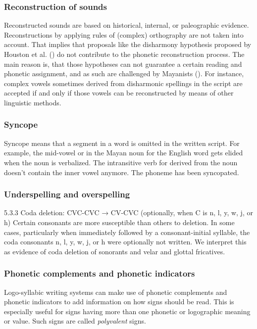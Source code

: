 \documentclass[../main.tex]{subfiles}
\begin{document}
\subsubsection{Reconstruction of sounds}
Reconstructed sounds are based on historical, internal, or paleographic evidence.
Reconstructions by applying rules of (complex) orthography are not taken into account.
That implies that proposals like the disharmony hypothesis proposed by 
Houston et al. (\cites{lacadena2004}{houstonstuartrobertson1998}) do not contribute to the
phonetic reconstruction process.
The main reason is, that those hypotheses can not guarantee a certain reading and phonetic
assignment, and as such are challenged by Mayanists (\cite[7]{boot2009}).
For instance, complex vowels sometimes derived from disharmonic spellings in the script are
accepted if and only if those vowels can be reconstructed by means of other linguistic methods.

\subsubsection{Syncope}
Syncope means that a segment in a word is omitted in the written script.
For example, the mid-vowel  or  in the Mayan noun  
for the English word  gets elided when the noun is verbalized.
The intransitive verb  for  derived from the 
noun  doesn't contain the inner vowel anymore.
The phoneme has been syncopated.

\subsubsection{Underspelling and overspelling}
\cite[143-144]{lawstuart2017}
5.3.3 Coda deletion: CVC-CVC → CV-CVC (optionally, when C is n, l, y, w, j, or h)
Certain consonants are more susceptible than others to deletion. In some cases, particularly when immediately followed by a consonant-initial syllable, the coda consonants n,
l, y, w, j, or h were optionally not written. We interpret this as evidence of coda deletion of sonorants and velar and glottal fricatives. 

\subsubsection{Phonetic complements and phonetic indicators}
Logo-syllabic writing systems can make use of phonetic complements and phonetic indicators to
add information on how signs should be read.
This is especially useful for signs having more than one phonetic or logographic meaning or value.
Such signs are called \emph{polyvalent} signs.
\end{document}
